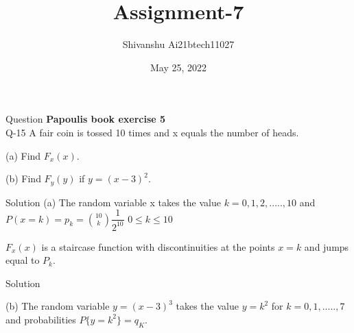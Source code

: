 \documentclass[15pt]{beamer}
\title{Assignment-7}
\author{Shivanshu  Ai21btech11027}
\date{May 25, 2022}
\begin{document}
    \maketitle
    
    \begin{frame}{Question}
        \textbf{Papoulis book exercise 5}\\
        \large \noindent Q-15 A fair coin is tossed 10 times and x equals the number of heads.
        
        (a) Find $F_x(x)$.
        
        (b) Find $F_y(y)$ if $y = (x-3)^2$.
    \end{frame}
    \begin{frame}{Solution}
    (a) The random variable x takes the value $k = 0,1,2,.....,10$ and \\
     \hspace{5mm}$P(x=k) = p_k = {10\choose k}\dfrac{1}{2^{10}}$ \hspace{5mm} $0\leq k \leq 10$
    
    $F_x(x)$ is a staircase function with discontinuities at the points $x=k$ and jumps equal to $P_k$.
    \end{frame}
    \begin{frame}{Solution}
    
    (b) The random variable $y = (x - 3)^3$
    takes the value $y = k^2$ for $k = 0,1,.....,7$ and probabilities $P\{y = k^2\} = q_K$.
    \begin{table}[ht!]
            \centering
            
            \vspace{3pt}
    \end{table}
       
    \end{frame}   
\end{document}
